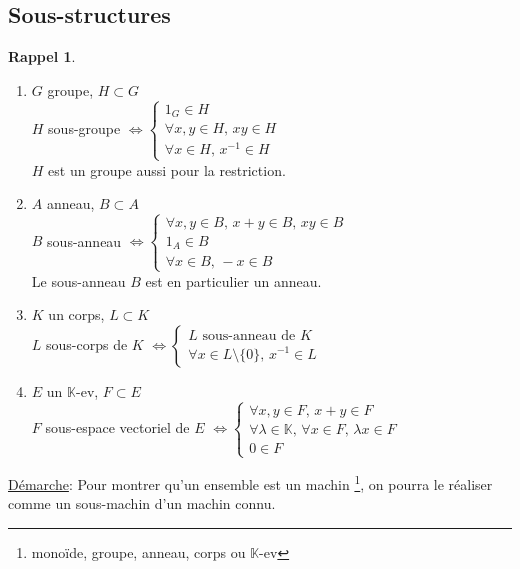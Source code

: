 \documentclass[10pt,a4paper]{article}
\theoremstyle{definition}
\newtheorem*{rappel}{Rappel}
\begin{document}
\subsection{Sous-structures}
\begin{rappel} \hfill
\begin{enumerate}
\item $G$ groupe, $H \subset G$ \\
$H$ sous-groupe $\iff \begin{cases}
1_G \in H \\
\forall x, y \in H,\, xy \in H \\
\forall x \in H,\, x^{-1} \in H
\end{cases}$ \\
$H$ est un groupe aussi pour la restriction.
\item $A$ anneau, $B \subset A$ \\
$B$ sous-anneau $\iff \begin{cases}
\forall x, y \in B,\, x + y \in B,\, xy \in B \\
1_A \in B \\
\forall x \in B,\, -x \in B
\end{cases}$ \\
Le sous-anneau $B$ est en particulier un anneau.
\item $K$ un corps, $L \subset K$ \\
$L$ sous-corps de $K$ $\iff \begin{cases}
L \text{ sous-anneau de } K \\
\forall x \in L \setminus \{ 0 \},\, x^{-1} \in L
\end{cases}$
\item $E$ un $\mathbb{K}$-ev, $F \subset E$ \\
$F$ sous-espace vectoriel de $E$ $\iff \begin{cases}
\forall x, y \in F,\, x + y \in F \\
\forall \lambda \in \mathbb{K},\, \forall x \in F,\, \lambda x \in F \\
0 \in F
\end{cases}$
\end{enumerate}
\end{rappel}
\noindent \uline{Démarche}: Pour montrer qu'un ensemble est un machin \footnote{monoïde, groupe, anneau, corps ou $\mathbb{K}$-ev}, on pourra le réaliser comme un sous-machin d'un machin connu.
\end{document}
